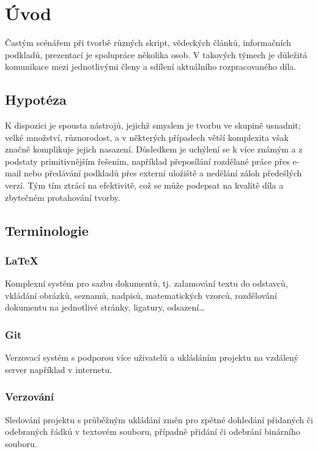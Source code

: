 \chapter{Úvod}
Častým scénářem při tvorbě různých skript, vědeckých článků, informačních podkladů, prezentací je spolupráce několika osob. V takových týmech je důležitá komunikace mezi jednotlivými členy a sdílení aktuálního rozpracovaného díla.

\section{Hypotéza}

K dispozici je spousta nástrojů, jejichž smyslem je tvorbu ve skupině usnadnit; velké množství, různorodost, a v některých případech větší komplexita však značně komplikuje jejich nasazení. Důsledkem je uchýlení se k více známým a z podstaty primitivnějším řešením, například přeposílání rozdělané práce přes e-mail nebo předávání podkladů přes externí uložiště a nedělání záloh předešlých verzí. Tým tím ztrácí na efektivitě, což se může podepsat na kvalitě díla a zbytečném protahování tvorby.

\section{Terminologie}

\subsection{\LaTeX}

Komplexní systém pro sazbu dokumentů, tj. zalamování textu do odstavců, vkládání obrázků, seznamů, nadpisů, matematických vzorců, rozdělování dokumentu na jednotlivé stránky, ligatury, odsazení\ldots \cite{latex-def}

\subsection{Git}

Verzovací systém s podporou více uživatelů a ukládáním projektu na vzdálený server například v internetu.

\subsection{Verzování}

Sledování projektu s průběžným ukládání změn pro zpětné dohledání přidaných či odebraných řádků v textovém souboru, případně přidání či odebrání binárního souboru.

